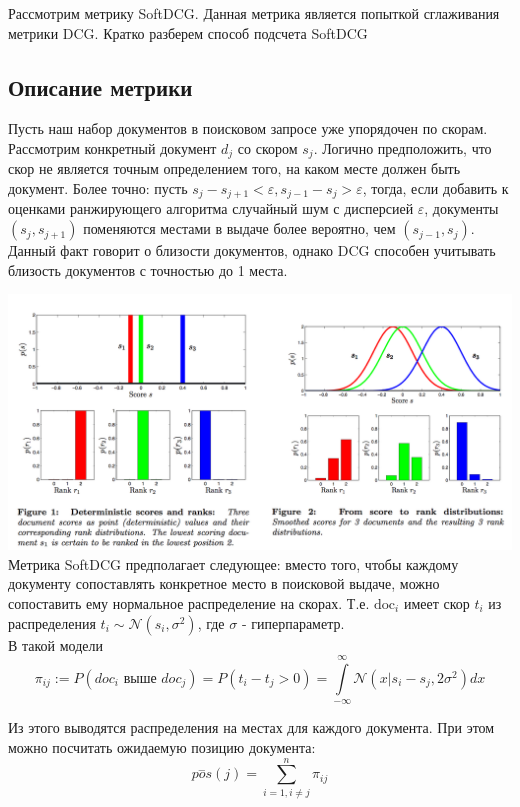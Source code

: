 \documentclass[14pt,a4paper]{amsart}
\theoremstyle{definition}
\theoremstyle{definition}
\newcommand{\N}{\mathcal{N}}
\newcommand{\Sum}{\sum\limits}
\newcommand{\Int}{\int\limits}
\renewcommand\t{\text}
\begin{document}
Рассмотрим  метрику SoftDCG. Данная метрика является попыткой сглаживания метрики DCG. Кратко разберем способ подсчета SoftDCG

\subsection{Описание метрики}

Пусть наш набор документов в поисковом запросе уже упорядочен по скорам. Рассмотрим конкретный документ $d_j$ со скором $s_j$. Логично предположить, что скор не является точным определением того, на каком месте должен быть документ. Более точно: пусть ${s_j - s_{j + 1} < \varepsilon, s_{j - 1} - s_j > \varepsilon}$, тогда, если добавить к оценками ранжирующего алгоритма случайный шум с дисперсией $\varepsilon$, документы $(s_j, s_{j+1})$ поменяются местами в выдаче более вероятно, чем $(s_{j-1}, s_j)$. Данный факт говорит о близости документов, однако DCG способен учитывать близость документов с точностью до 1 места.

\hspace*{-0.7cm}\includegraphics[width=\textwidth]{SoftDCG} \\

Метрика SoftDCG предполагает следующее: вместо того, чтобы каждому документу сопоставлять конкретное место в поисковой выдаче, можно сопоставить ему нормальное распределение на скорах. Т.е. $\t{doc}_i$ имеет скор $t_i$ из распределения $t_i \sim \N(s_i, \sigma^2)$, где $\sigma$ - гиперпараметр.\\
В такой модели $$\pi_{ij} := P(doc_i \t{ выше } doc_j) = P(t_i - t_j > 0) = \Int_{-\infty}^{\infty}\N(x|s_i - s_j,2\sigma^2) dx$$

Из этого выводятся распределения на местах для каждого документа. При этом можно посчитать ожидаемую позицию документа: $$\overset{-}{pos}(j) = \Sum_{i=1,i \neq j}^n \pi_{ij}$$ 
\end{document}
